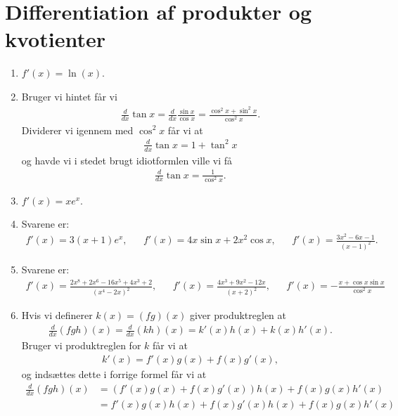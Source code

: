 \section{Differentiation af produkter og kvotienter}
\begin{enumerate}
	\item $f'(x)=\ln(x)$.
	
	\item\label{it:diff21ans} Bruger vi hintet får vi
	\begin{align*}
	\frac{d}{dx} \tan x=\frac{d}{dx} \frac{\sin x}{\cos x}=\frac{\cos^2 x+\sin^2 x}{\cos^2 x}.
	\end{align*}
	Dividerer vi igennem med $ \cos^2 x $ får vi at 
	\begin{align*}
	\frac{d}{dx} \tan x= 1+\tan^2x
	\end{align*}
	og havde vi i stedet brugt idiotformlen ville vi få
	\begin{align*}
	\frac{d}{dx} \tan x= \frac{1}{\cos^2 x}.
	\end{align*}

	\item $f'(x)=xe^x$.
	
	\item Svarene er:
	\begin{align*}
	f'(x)=3(x+1)e^x,&& f'(x)=4x\sin x+2x^2\cos x,&& f'(x)=\frac{3x^2-6x-1}{(x-1)^2}.
	\end{align*}
	
	
	\item Svarene er:
	\begin{align*}
	f'(x)=\frac{2x^8+2x^6-16x^5+4x^3+2 }{(x^4-2x)^2},&& f'(x)=\frac{4x^3+9x^2-12x}{(x+2)^2},&& f'(x)=-\frac{x+\cos x\sin x}{\cos^2 x}
	\end{align*} 
	
	
	\item Hvis vi definerer $k(x)=(fg)(x)$ giver produktreglen at
	\begin{align*}
	\frac{d}{dx} (fgh)(x)=\frac{d}{dx} (kh)(x)=k'(x)h(x)+k(x)h'(x).
	\end{align*} 
	Bruger vi produktreglen for $k$ får vi at 
	\begin{align*}
	k'(x)=f'(x)g(x)+f(x)g'(x),
	\end{align*}
	og indsættes dette i forrige formel får vi at
	\begin{align*}
	\frac{d}{dx} (fgh)(x)&=(f'(x)g(x)+f(x)g'(x))h(x)+f(x)g(x)h'(x)\\
	&=f'(x)g(x)h(x)+f(x)g'(x)h(x)+f(x)g(x)h'(x)
	\end{align*}
	

\end{enumerate}

